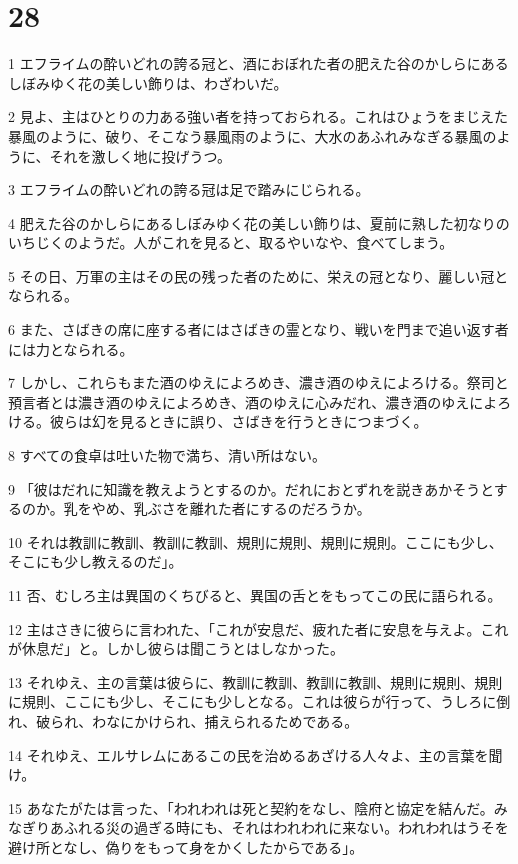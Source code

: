 \chapter{28}

\par 1 エフライムの酔いどれの誇る冠と、酒におぼれた者の肥えた谷のかしらにあるしぼみゆく花の美しい飾りは、わざわいだ。
\par 2 見よ、主はひとりの力ある強い者を持っておられる。これはひょうをまじえた暴風のように、破り、そこなう暴風雨のように、大水のあふれみなぎる暴風のように、それを激しく地に投げうつ。
\par 3 エフライムの酔いどれの誇る冠は足で踏みにじられる。
\par 4 肥えた谷のかしらにあるしぼみゆく花の美しい飾りは、夏前に熟した初なりのいちじくのようだ。人がこれを見ると、取るやいなや、食べてしまう。
\par 5 その日、万軍の主はその民の残った者のために、栄えの冠となり、麗しい冠となられる。
\par 6 また、さばきの席に座する者にはさばきの霊となり、戦いを門まで追い返す者には力となられる。
\par 7 しかし、これらもまた酒のゆえによろめき、濃き酒のゆえによろける。祭司と預言者とは濃き酒のゆえによろめき、酒のゆえに心みだれ、濃き酒のゆえによろける。彼らは幻を見るときに誤り、さばきを行うときにつまづく。
\par 8 すべての食卓は吐いた物で満ち、清い所はない。
\par 9 「彼はだれに知識を教えようとするのか。だれにおとずれを説きあかそうとするのか。乳をやめ、乳ぶさを離れた者にするのだろうか。
\par 10 それは教訓に教訓、教訓に教訓、規則に規則、規則に規則。ここにも少し、そこにも少し教えるのだ」。
\par 11 否、むしろ主は異国のくちびると、異国の舌とをもってこの民に語られる。
\par 12 主はさきに彼らに言われた、「これが安息だ、疲れた者に安息を与えよ。これが休息だ」と。しかし彼らは聞こうとはしなかった。
\par 13 それゆえ、主の言葉は彼らに、教訓に教訓、教訓に教訓、規則に規則、規則に規則、ここにも少し、そこにも少しとなる。これは彼らが行って、うしろに倒れ、破られ、わなにかけられ、捕えられるためである。
\par 14 それゆえ、エルサレムにあるこの民を治めるあざける人々よ、主の言葉を聞け。
\par 15 あなたがたは言った、「われわれは死と契約をなし、陰府と協定を結んだ。みなぎりあふれる災の過ぎる時にも、それはわれわれに来ない。われわれはうそを避け所となし、偽りをもって身をかくしたからである」。
